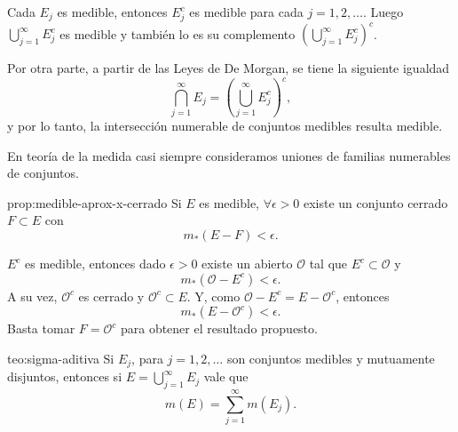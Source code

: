 \begin{demo}
Cada $E_j$ es medible, entonces $E_j^c$ es medible para cada $j=1,2,\ldots$. Luego $\bigcup\limits_{j=1}^{\infty} E_j^c$ es medible y tambi\'en lo es su complemento 
$ \left(\bigcup\limits_{j=1}^{\infty} E_j^c\right)^c$.

Por otra parte,  a partir de las Leyes de De Morgan, se tiene la siguiente igualdad
\[
\bigcap\limits_{j=1}^{\infty}E_j= 
\left( \bigcup\limits_{j=1}^{\infty} E_j^c\right)^c,
\]
y por lo tanto, la intersecci\'on numerable de conjuntos medibles  resulta medible.
\end{demo}

\begin{observacion} En teoría de la medida casi siempre consideramos uniones de familias numerables de conjuntos.  
 
\end{observacion}


\begin{proposicion}{prop:medible-aprox-x-cerrado}
Si $E$ es medible, $\forall \epsilon>0$ existe un conjunto cerrado $F\subset E$ con
\[
m_{*}(E-F)<\epsilon.
\]
\end{proposicion}


\begin{demo}
$E^c$ es medible, entonces dado $\epsilon>0$ existe un abierto $\mathcal{O}$ tal que $E^c \subset \mathcal{O}$ y 
\[
m_{*}(\mathcal{O}-E^c)<\epsilon.
\]
A su vez, $\mathcal{O}^c$ es cerrado y $\mathcal{O}^c\subset E$. 
Y, como $\mathcal{O}-E^c=E-\mathcal{O}^c$, entonces
\[
m_{*}(E-\mathcal{O}^c)<\epsilon.
\]
Basta tomar $F=\mathcal{O}^c$ para obtener el resultado propuesto.
\end{demo}

\begin{teorema}{teo:sigma-aditiva}
Si $E_j$, para $j=1,2,\ldots$ son conjuntos medibles y mutuamente disjuntos, entonces si $E=\bigcup\limits_{j=1}^\infty E_j$ vale que
\[
m( E)=\sum\limits_{j=1}^{\infty} m(E_j).
\]
\end{teorema}

